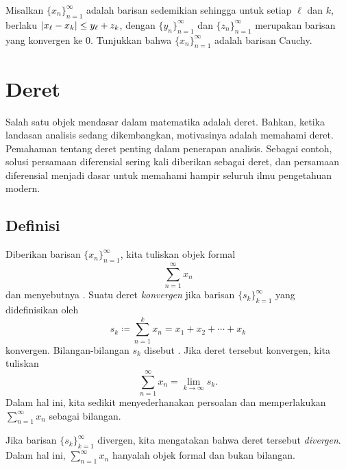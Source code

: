 \begin{exercise}
Misalkan 
$\{ x_n \}_{n=1}^\infty$ adalah barisan sedemikian sehingga untuk setiap $\ell$ dan $k$,
berlaku
$\lvert {x_\ell-x_k} \rvert \leq y_\ell + z_k$, dengan
$\{ y_n \}_{n=1}^\infty$ dan 
$\{ z_n \}_{n=1}^\infty$ merupakan barisan yang konvergen ke $0$.
Tunjukkan bahwa 
$\{ x_n \}_{n=1}^\infty$ adalah barisan Cauchy.
\end{exercise}



\sectionnewpage
\section{Deret}
\label{sec:series}



Salah satu objek mendasar dalam matematika adalah deret.  Bahkan, ketika
landasan analisis sedang dikembangkan, motivasinya adalah
memahami deret.  Pemahaman tentang deret penting dalam penerapan
analisis.  Sebagai contoh, solusi persamaan diferensial sering kali
diberikan sebagai deret, dan persamaan diferensial menjadi dasar untuk memahami
hampir seluruh ilmu pengetahuan modern.

\subsection{Definisi}

\begin{defn}
Diberikan barisan $\{ x_n \}_{n=1}^\infty$, kita tuliskan objek formal
\begin{equation*}
\sum_{n=1}^\infty x_n
\end{equation*}
dan menyebutnya \emph{}.  Suatu deret
\emph{konvergen} jika barisan
$\{ s_k \}_{k=1}^\infty$
yang didefinisikan oleh
\begin{equation*}
s_k \coloneqq \sum_{n=1}^k x_n = x_1 + x_2 + \cdots + x_k
\end{equation*}
konvergen.
Bilangan-bilangan $s_k$ disebut
\emph{}.
Jika deret tersebut konvergen, kita tuliskan
\begin{equation*}
\sum_{n=1}^\infty x_n =  \lim\limits_{k\to\infty} s_k .
\end{equation*}
Dalam hal ini, kita sedikit menyederhanakan persoalan dan memperlakukan
$\sum_{n=1}^\infty x_n$ sebagai bilangan.

Jika barisan $\{ s_k \}_{k=1}^\infty$ divergen,
kita mengatakan bahwa deret tersebut \emph{divergen}.
Dalam hal ini, $\sum_{n=1}^\infty x_n$ hanyalah objek formal dan bukan bilangan.
\end{defn}


